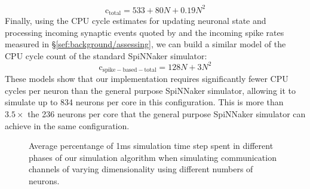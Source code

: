 \documentclass[conference]{IEEEtran}
\begin{document}
%
\begin{equation}
  \mathrm{c}_\mathrm{total} = 533 + 80 N + 0.19 N^{2}\label{eq:profiling_total_eliasmith}
\end{equation}
%
Finally, using the CPU cycle estimates for updating neuronal state and processing incoming synaptic events quoted by \textcite{Sharp2013} and the incoming spike rates measured in \S\ref{sef:background/assessing}, we can build a similar model of the CPU cycle count of the standard SpiNNaker simulator:
%
\begin{equation}
  \mathrm{c}_\mathrm{spike-based-total} = 128N + 3 N^{2}\label{eq:profiling_spike_based_total}
\end{equation}
% 
These models show that our implementation requires significantly fewer CPU cycles per neuron than the general purpose SpiNNaker simulator, allowing it to simulate up to 834 neurons per core in this configuration. 
This is more than $3.5 \times$ the 236 neurons per core that the general purpose SpiNNaker simulator can achieve in the same configuration.


  \begin{figure}[!t]
    \centering
    \hfil
    \caption{Average percentange of 1ms simulation time step spent in different phases of our simulation algorithm when simulating communication channels of varying dimensionality using different numbers of neurons.}
    \label{fig:results/comm-channel-cpu}
  \end{figure}
\end{document}
